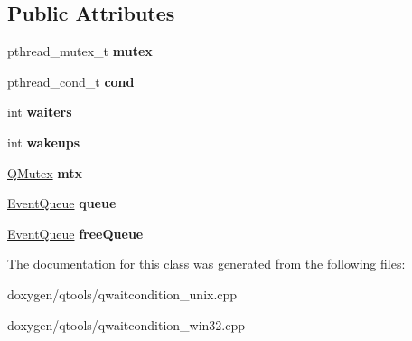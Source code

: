 \subsection*{Public Attributes}
\begin{DoxyCompactItemize}
\item 
\mbox{\label{class_q_wait_condition_private_a361375d2df4f05c0dddfc1f95832a73b}} 
pthread\+\_\+mutex\+\_\+t {\bfseries mutex}
\item 
\mbox{\label{class_q_wait_condition_private_abcfdb90df4a7edd76960e7ce3e7d11c7}} 
pthread\+\_\+cond\+\_\+t {\bfseries cond}
\item 
\mbox{\label{class_q_wait_condition_private_ae4a4fc8e92470eb0a2032dd9a1cd0c92}} 
int {\bfseries waiters}
\item 
\mbox{\label{class_q_wait_condition_private_aa89133c3205f41565f70014242dbb6ba}} 
int {\bfseries wakeups}
\item 
\mbox{\label{class_q_wait_condition_private_ae775be2a78da7b5bfc8e6159a5b1a230}} 
\mbox{\hyperlink{class_q_mutex}{Q\+Mutex}} {\bfseries mtx}
\item 
\mbox{\label{class_q_wait_condition_private_ab312b34eeb97bd25d20b86b9fff1de16}} 
\mbox{\hyperlink{class_event_queue}{Event\+Queue}} {\bfseries queue}
\item 
\mbox{\label{class_q_wait_condition_private_a3b96ce780ed74cb13bcee57f7044f24a}} 
\mbox{\hyperlink{class_event_queue}{Event\+Queue}} {\bfseries free\+Queue}
\end{DoxyCompactItemize}


The documentation for this class was generated from the following files\+:\begin{DoxyCompactItemize}
\item 
doxygen/qtools/qwaitcondition\+\_\+unix.\+cpp\item 
doxygen/qtools/qwaitcondition\+\_\+win32.\+cpp\end{DoxyCompactItemize}
